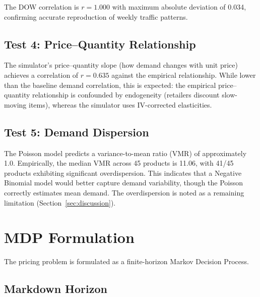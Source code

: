 \documentclass[11pt,a4paper]{article}
\begin{document}
The DOW correlation is $r = 1.000$ with maximum absolute deviation of 0.034, confirming accurate reproduction of weekly traffic patterns.

\subsection{Test 4: Price--Quantity Relationship}

The simulator's price--quantity slope (how demand changes with unit price) achieves a correlation of $r = 0.635$ against the empirical relationship.
While lower than the baseline demand correlation, this is expected: the empirical price--quantity relationship is confounded by endogeneity (retailers discount slow-moving items), whereas the simulator uses IV-corrected elasticities.

\subsection{Test 5: Demand Dispersion}

The Poisson model predicts a variance-to-mean ratio (VMR) of approximately 1.0.
Empirically, the median VMR across 45 products is 11.06, with 41/45 products exhibiting significant overdispersion.
This indicates that a Negative Binomial model would better capture demand variability, though the Poisson correctly estimates mean demand.
The overdispersion is noted as a remaining limitation (Section~\ref{sec:discussion}).

\section{MDP Formulation}
\label{sec:mdp}

The pricing problem is formulated as a finite-horizon Markov Decision Process.

\subsection{Markdown Horizon}
\end{document}

